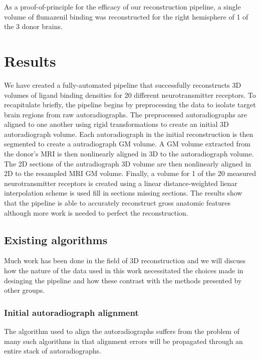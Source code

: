 \documentclass[12pt]{article}
\begin{document}
As a proof-of-principle for the efficacy of our reconstruction pipeline, a single volume of flumazenil binding was reconstructed for the right hemisphere of 1 of the 3 donor brains. 

\section{Results}



\Discussion{}
We have created a fully-automated pipeline that successfully reconstructs 3D volumes of ligand binding densities for 20 different neurotransmitter receptors. To recapitulate briefly, the pipeline begins by preprocessing the data to isolate target brain regions from raw autoradiographs. The preprocessed autoradiographs are aligned to one another using rigid transformations to create an initial 3D autoradiograph volume. Each autoradiograph in the initial reconstruction is then segmented to create a autradiograph GM volume. A GM volume extracted from the donor's MRI is then nonlinearly aligned in 3D to the autoradiograph volume. The 2D sections of the autradiograph 3D volume are then nonlinearly aligned in 2D to the resampled MRI GM volume. Finally, a volume for 1 of the 20 measured neurotransmitter receptors is created using a linear distance-weighted lienar interpolation scheme is used fill in sections missing sections. The results show that the pipeline is able to accurately reconstruct gross anatomic features although more work is needed to perfect the reconstruction. 

\subsection{Existing algorithms}

Much work has been done in the field of 3D reconstruction and we will discuss how the nature of the data used in this work necessitated the choices made in desinging the pipeline and how these contrast with the methods presented by other groups. 

\subsubsection{Initial autoradiograph alignment}

The algorithm used to align the autoradiographs suffers from the problem of many such algorithms in that alignment errors will be propagated through an entire stack of autoradiographs. 
\end{document}
